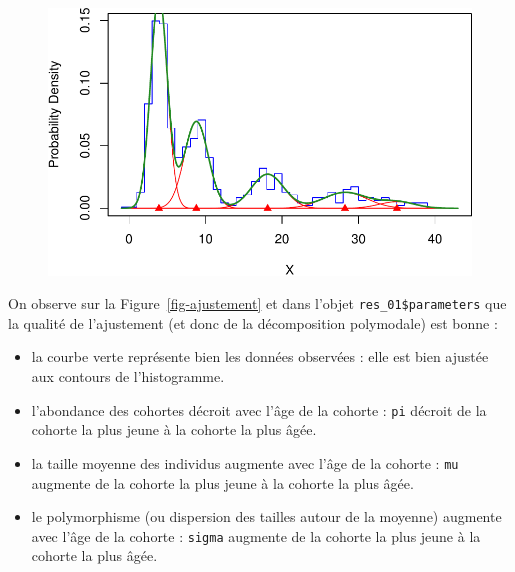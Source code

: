 \documentclass[
  a4paper,
  DIV=11,
  numbers=noendperiod,
  oneside]{scrreprt}
\providecommand{\tightlist}{%
  \setlength{\itemsep}{0pt}\setlength{\parskip}{0pt}}\usepackage{longtable,booktabs,array}
\begin{document}
\begin{figure}


{\centering \includegraphics{04-Cohortes_files/figure-pdf/fig-ajustement-1.pdf}

}

\end{figure}

On observe sur la Figure~\ref{fig-ajustement} et dans l'objet
\texttt{res\_01\$parameters} que la qualité de l'ajustement (et donc de
la décomposition polymodale) est bonne :

\begin{itemize}
\tightlist
\item
  la courbe verte représente bien les données observées : elle est bien
  ajustée aux contours de l'histogramme.
\item
  l'abondance des cohortes décroit avec l'âge de la cohorte :
  \texttt{pi} décroit de la cohorte la plus jeune à la cohorte la plus
  âgée.
\item
  la taille moyenne des individus augmente avec l'âge de la cohorte :
  \texttt{mu} augmente de la cohorte la plus jeune à la cohorte la plus
  âgée.
\item
  le polymorphisme (ou dispersion des tailles autour de la moyenne)
  augmente avec l'âge de la cohorte : \texttt{sigma} augmente de la
  cohorte la plus jeune à la cohorte la plus âgée.
\end{itemize}
\end{document}
